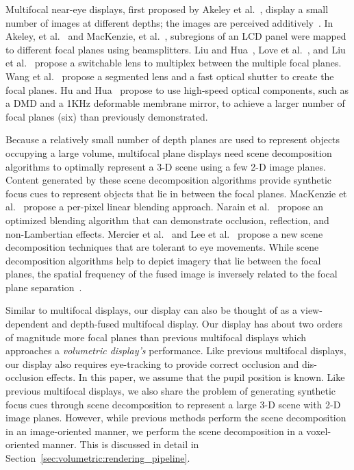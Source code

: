 Multifocal near-eye displays, first proposed by Akeley et al.~\cite{Akeley2004stereo}, display a small number of images at different depths; the images are perceived additively~\cite{Akeley2004stereo,MacKenzie2010Accommodation,Liu2010novel,Love2009high,Hu2015Design}. In Akeley, et al.~\cite{Akeley2004stereo} and MacKenzie, et al.~\cite{MacKenzie2010Accommodation}, subregions of an LCD panel were mapped to different focal planes using beamsplitters. Liu and Hua~\cite{liu2009time}, Love et al.~\cite{Love2009high}, and Liu et al.~\cite{Liu2010novel} propose a switchable lens to multiplex between the multiple focal planes. Wang et al.~\cite{wang2018digitally} propose a segmented lens and a fast optical shutter to create the focal planes.  Hu and Hua~\cite{Hu2014design,Hu2014High,Hu2015Design} propose to use high-speed optical components, such as a DMD and a 1KHz deformable membrane mirror, to achieve a larger number of focal planes (six) than previously demonstrated. 

Because a relatively small number of depth planes are used to represent objects occupying a large volume, multifocal plane displays need scene decomposition algorithms to optimally represent a 3-D scene using a few 2-D image planes. Content generated by these scene decomposition algorithms provide synthetic focus cues to represent objects that lie in between the focal planes. MacKenzie et al.~\cite{MacKenzie2010Accommodation} propose a per-pixel linear blending approach. Narain et al.~\cite{Narain2015optimal} propose an optimized blending algorithm that can demonstrate occlusion, reflection, and non-Lambertian effects. Mercier et al.~\cite{Mercier2017Fast} and Lee et al.~\cite{Lee2017foveated} propose a new scene decomposition techniques that are tolerant to eye movements. While scene decomposition algorithms help to depict imagery that lie between the focal planes, the spatial frequency of the fused image is inversely related to the focal plane separation~\cite{Hu2014design, Hua2017Enabling}. 

Similar to multifocal displays, our display can also be thought of as a view-dependent and depth-fused multifocal display. Our display has about two orders of magnitude more focal planes than previous multifocal displays which approaches a \emph{volumetric display's} performance. Like previous multifocal displays, our display also requires eye-tracking to provide correct occlusion and dis-occlusion effects. In this paper, we assume that the pupil position is known. Like previous multifocal displays, we also share the problem of generating synthetic focus cues through scene decomposition to represent a large 3-D scene with 2-D image planes. However, while previous methods perform the scene decomposition in an image-oriented manner, we perform the scene decomposition in a voxel-oriented manner. This is discussed in detail in Section~\ref{sec:volumetric:rendering_pipeline}. 

